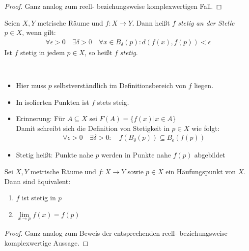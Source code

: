 \begin{proof}
	Ganz analog zum reell- beziehungsweise komplexwertigen Fall.
\end{proof}

\begin{Definition}{%
	Seien $X,Y$ metrische Räume und $f: X \rightarrow Y$. Dann heißt $f$ 
	\emph{stetig an der Stelle} $p \in X$, wenn gilt:
	\begin{align*}
		\forall \epsilon > 0 \quad \exists \delta > 0 \quad \forall x \in 
		B_\delta (p) : d(f(x),f(p)) < \epsilon
	\end{align*}
	Ist $f$ stetig in jedem $p \in X$, so heißt $f$ \emph{stetig}.
}\end{Definition}

\begin{Bemerkung}{
	~\begin{itemize}
		\item Hier muss $p$ selbstverständlich im Definitionsbereich von $f$ liegen.
		\item In isolierten Punkten ist $f$ stets steig.
		\item Erinnerung: Für $A \subseteq X$ sei $F(A) = \{f(x) \vert x \in A\}$ \\
			Damit schreibt sich die Definition von Stetigkeit in $p \in X$ wie 
			folgt:
			\begin{align*}
				\forall \epsilon > 0 \quad \exists \delta > 0: \quad 
				f(B_\delta(p)) \subseteq B_\epsilon(f(p))
			\end{align*}
		\item Stetig heißt: \glqq Punkte nahe $p$ werden in Punkte nahe 
			$f(p)$ abgebildet\grqq{}
	\end{itemize}
}\end{Bemerkung}

\begin{Satz} \label{vl_24_satz_2}%
	Sei $X, Y$ metrische Räume und $f: X \rightarrow Y$ sowie $p \in X$ ein 
	Häufungspunkt von $X$. Dann sind äquivalent: 
	\begin{enumerate}
		\item \label{vl_24_stp_3} $f$ ist stetig in $p$
		\item \label{vl_24_stp_4} $\lim\limits_{x \rightarrow p}{f(x)} = f(p)$
	\end{enumerate}
\end{Satz}

\begin{proof}
	Ganz analog zum Beweis der entsprechenden reell- beziehungsweise komplexwertige 
	Aussage.
\end{proof}


